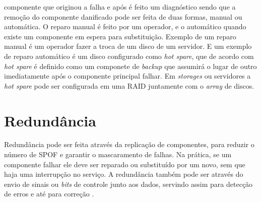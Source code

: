 \begin{itemize}
 componente que originou a falha e após é feito um diagnóstico sendo que a remoção do componente danificado pode ser feita de duas formas, 
 manual ou automática. O reparo manual é feito por um operador, e o automático quando existe um componente em espera para substituição.
 Exemplo de um reparo manual é um operador fazer a troca de um disco de um servidor. E um exemplo de reparo automático é um disco configurado
 como \textit{hot spare}, que de acordo com \cite{rouse2013} \textit{hot spare} é definido como um componete de \textit{backup} que assumirá 
 o lugar de outro imediatamente após o componente principal falhar. Em \textit{storages} ou servidores a \textit{hot spare} pode ser configurada 
 em uma  \ac{RAID} juntamente com o \textit{array} de discos.
\end{itemize}

\section{Redundância}
\label{section:redundancia}

Redundância pode ser feita através da replicação de componentes, para reduzir o número de \ac{SPOF} e garantir o mascaramento de falhas.
Na prática, se um componente falhar ele deve ser reparado ou substituído por um novo, sem que haja uma interrupção no serviço.
A redundância também pode ser através do envio de sinais ou \textit{bits} de controle junto aos dados, 
servindo assim para detecção de erros e até para correção \cite{weber2002}.

